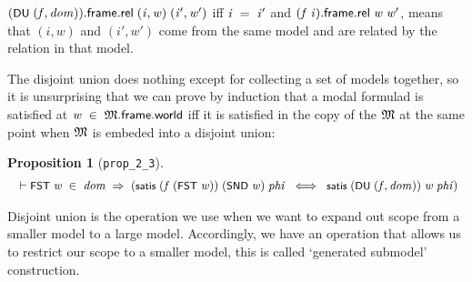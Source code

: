 \documentclass[letterpaper]{article}
\newtheorem{prop}{Proposition}
\renewcommand{\HOLConst}[1]{{\textsf{\upshape\small #1}}}
\renewcommand{\HOLinline}[1]{\ensuremath{#1}}
\newenvironment{holmath}{\begin{displaymath}\begin{array}{l}}{\end{array}\end{displaymath}\ignorespacesafterend}
\begin{document}
 \HOLinline{(\HOLConst{DU}\;(\HOLFreeVar{f}\HOLSymConst{,}\HOLFreeVar{dom})).\HOLFieldName{frame}.\HOLFieldName{rel}\;(\HOLFreeVar{i}\HOLSymConst{,}\HOLFreeVar{w})\;(\HOLFreeVar{i\sp{\prime}}\HOLSymConst{,}\HOLFreeVar{w\sp{\prime}})} iff \HOLinline{\HOLFreeVar{i}\;\HOLSymConst{=}\;\HOLFreeVar{i\sp{\prime}}} and \HOLinline{(\HOLFreeVar{f}\;\HOLFreeVar{i}).\HOLFieldName{frame}.\HOLFieldName{rel}\;\HOLFreeVar{w}\;\HOLFreeVar{w\sp{\prime}}}, means that $(i,w)$ and $(i',w')$ come from the same model and are related by the relation in that model. 

The disjoint union does nothing except for collecting a set of models together, so it is unsurprising that we can prove by induction that a modal formulad is satisfied at \HOLinline{\HOLFreeVar{w}\;\HOLSymConst{\HOLTokenIn{}}\;\HOLFreeVar{\ensuremath{\mathfrak{M}}}.\HOLFieldName{frame}.\HOLFieldName{world}} iff it is satisfied in the copy of the \HOLinline{\HOLFreeVar{\ensuremath{\mathfrak{M}}}} at the same point when \HOLinline{\HOLFreeVar{\ensuremath{\mathfrak{M}}}} is embeded into a disjoint union:
\begin{prop}[\texttt{prop_2_3}]
\begin{holmath}
  \ensuremath{\HOLTokenTurnstile}\HOLConst{FST}\;\HOLFreeVar{w}\;\HOLSymConst{\HOLTokenIn{}}\;\HOLFreeVar{dom}\;\HOLSymConst{\HOLTokenImp{}}\;(\HOLConst{satis}\;(\HOLFreeVar{f}\;(\HOLConst{FST}\;\HOLFreeVar{w}))\;(\HOLConst{SND}\;\HOLFreeVar{w})\;\HOLFreeVar{phi}\;\HOLSymConst{\HOLTokenEquiv{}}\;\HOLConst{satis}\;(\HOLConst{DU}\;(\HOLFreeVar{f}\HOLSymConst{,}\HOLFreeVar{dom}))\;\HOLFreeVar{w}\;\HOLFreeVar{phi})
\end{holmath}
\end{prop}

Disjoint union is the operation we use when we want to expand out scope from a smaller model to a large model. Accordingly, we have an operation that allows us to restrict our scope to a smaller model, this is called `generated submodel' construction. 
\end{document}
